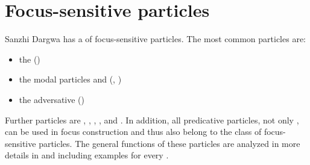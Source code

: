 
\section{Focus-sensitive particles}
\label{sec:Focus-sensitive particles}

Sanzhi Dargwa has a  of focus-sensitive particles. The most common particles are:
%
\begin{itemize}
	\item	the    ()
	\item	the modal particles  and  (, )
	\item	the adversative   ()
\end{itemize}

Further particles are  ,  ,  ,  , and  . In addition, all predicative particles, not only , can be used in focus construction and thus also belong to the class of focus-sensitive particles. The general functions of these particles are analyzed in more details in  and  including examples for every .

